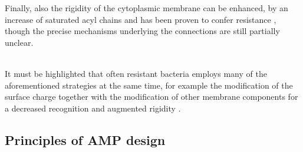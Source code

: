 Finally, also the rigidity of the cytoplasmic membrane can be enhanced, by an increase of saturated acyl chains and has been proven to confer resistance \cite{Band2014,Kumariya2015}, though the precise mechanisms underlying the connections are still partially unclear.

\hspace{0.5cm}
\\
It must be highlighted that often resistant bacteria employs many of the aforementioned strategies at the same time, for example the modification of the surface charge together with the modification of other membrane components for a decreased recognition and augmented rigidity \cite{Raetz2007}.


\subsection{Principles of AMP design}

